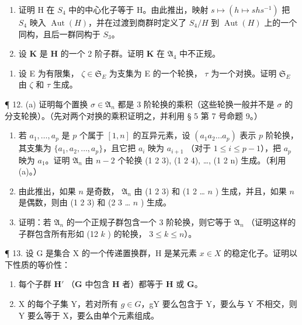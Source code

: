\begin{enumerate}
\def\labelenumi{(\alph{enumi})}
\setcounter{enumi}{1}
\item
  证明 H 在 \(S_{4}\) 中的中心化子等于 H。由此推出，映射 \(s \mapsto (h \mapsto shs^{-1})\) 把 \(S_{4}\) 映入 \(\operatorname{Aut}(H)\)，并在过渡到商群时定义了 \(S_{4}/H\) 到 \(\operatorname{Aut}(H)\) 上的一个同构，且后一群同构于 \(S_{3}\)。
\item
  设 \(\mathbf{K}\) 是 \(\mathbf{H}\) 的一个 2 阶子群。证明 \(\mathbf{K}\) 在 \(\mathfrak{A}_4\) 中不正规。
\end{enumerate}

\begin{enumerate}
\def\labelenumi{\arabic{enumi}。}
\setcounter{enumi}{10}
\tightlist
\item
  设 E 为有限集， \(\zeta \in \mathfrak{S}_{E}\) 为支集为 E 的一个轮换， \(\tau\) 为一个对换。证明 \(\mathfrak{S}_{E}\) 由 \(\zeta\) 和 \(\tau\) 生成。
\end{enumerate}

¶ 12. (a) 证明每个置换 \(\sigma \in \mathfrak{A}_n\) 都是 3 阶轮换的乘积（这些轮换一般并不是 \(\sigma\) 的分支轮换）。（先对两个对换的乘积证明之，并利用 § 5 第 7 号命题 9。）

\begin{enumerate}
\def\labelenumi{(\alph{enumi})}
\setcounter{enumi}{1}
\item
  若 \(a_1, \ldots, a_p\) 是 \(p\) 个属于 \([1, n]\) 的互异元素，设 \((a_1 a_2 \ldots a_p)\) 表示 \(p\) 阶轮换，其支集为 \(\{a_1, a_2, \ldots, a_p\}\)，且它把 \(a_i\) 映为 \(a_{i+1}\) （对于 \(1 \leqslant i \leqslant p-1\)），把 \(a_p\) 映为 \(a_1\)。证明 \(\mathfrak{A}_n\) 由 \(n-2\) 个轮换 (1 2 3), (1 2 4), \ldots, (1 2 n) 生成。（利用 (a)。）
\item
  由此推出，如果 \(n\) 是奇数， \(\mathfrak{A}_n\) 由 (1 2 3) 和 (1 2 \ldots{} \(n\) ) 生成，并且，如果 \(n\) 是偶数，则由 (1 2 3) 和 (2 3 \ldots{} \(n\) ) 生成。
\item
  证明：若 \(\mathfrak{A}_n\) 的一个正规子群包含一个 3 阶轮换，则它等于 \(\mathfrak{A}_n\) （证明这样的子群包含所有形如 (12 \(k\) ) 的轮换， \(3 \leqslant k \leqslant n\)）。
\end{enumerate}

¶ 13. 设 G 是集合 X 的一个传递置换群，H 是某元素 \(x \in X\) 的稳定化子。证明以下性质的等价性：

\begin{enumerate}
\def\labelenumi{(\alph{enumi})}
\item
  每个子群 \(\mathbf{H}'\) （\(\mathbf{G}\) 中包含 \(\mathbf{H}\) 者）都等于 \(\mathbf{H}\) 或 \(\mathbf{G}\)。
\item
  X 的每个子集 Y，若对所有 \(g \in G\)，gY 要么包含于 Y，要么与 Y 不相交，则 Y 要么等于 X，要么由单个元素组成。
\end{enumerate}


